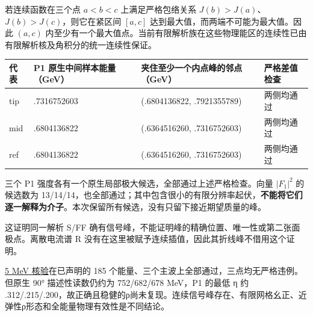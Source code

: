 \documentclass[
  10pt,
  a4paper,
]{article}
\newcounter{none} %
\begin{document}
若连续函数在三个点 \(a<b<c\) 上满足严格包络关系
\(J(b)>J(a)\)、\(J(b)>J(c)\)，则它在紧区间 \([a,c]\)
达到最大值，而两端不可能为最大值。因此 \((a,c)\)
内至少有一个最大值点。当前有限解析族在这些物理能区的连续性已由有限解析核及角积分的统一连续性保证。

{\def\LTcaptype{none} %
\begin{longtable}[]{@{}
  >{\raggedright\arraybackslash}p{}
  >{\raggedleft\arraybackslash}p{}
  >{\raggedright\arraybackslash}p{}
  >{\raggedright\arraybackslash}p{}@{}}
\toprule\noalign{}
\begin{minipage}[b]{\linewidth}\raggedright
代表
\end{minipage} & \begin{minipage}[b]{\linewidth}\raggedleft
P1 原生中间样本能量（GeV）
\end{minipage} & \begin{minipage}[b]{\linewidth}\raggedright
夹住至少一个内点峰的邻点（GeV）
\end{minipage} & \begin{minipage}[b]{\linewidth}\raggedright
严格差值检查
\end{minipage} \\
\midrule\noalign{}
\endhead
\bottomrule\noalign{}
\endlastfoot
tip & .7316752603 & (.6804136822, .7921355789) & 两侧均通过 \\
mid & .6804136822 & (.6364516260, .7316752603) & 两侧均通过 \\
ref & .6804136822 & (.6364516260, .7316752603) & 两侧均通过 \\
\end{longtable}
}

三个 P1 强度各有一个原生局部极大候选，全部通过上述严格检查。向量
\(|F_1|^2\) 的候选数为
13/14/14，也全部通过；其中包含很小的有限分辨率起伏，\textbf{不能将它们逐一解释为介子}。本次保留所有候选，没有只留下接近期望质量的峰。

这证明同一解析 S/FF
确有信号峰，不能证明峰的精确位置、唯一性或第二张面极点。离散电流谱 R
没有在这里被赋予连续插值，因此其折线峰不借用这个证明。

\href{../fine_grid_profiles/direct_profiles.json}{5 MeV 核验}在已声明的
185 个能量、三个主波上全部通过，三点均无严格违例。但原生 90°
描述性读数仍约为 752/682/678 MeV，P1 的最低 η 约
.312/.215/.200，故正确且稳健的ρ尚未复现。连续信号峰存在、有限网格幺正、近弹性ρ形态和全能量物理有效性是不同结论。
\end{document}
